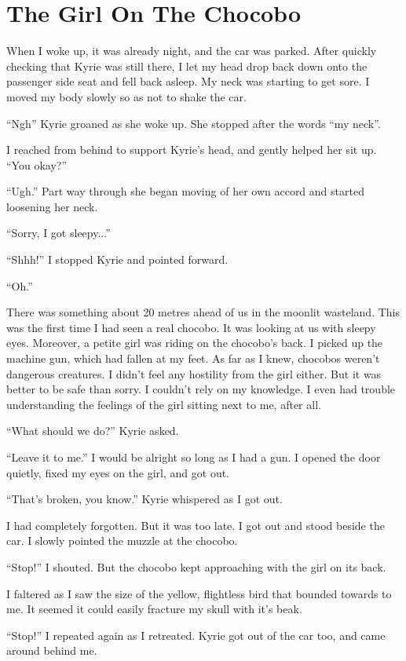 \documentclass[oneside]{book}
\begin{document}
\chapter{The Girl On The Chocobo}
When I woke up, it was already night, and the car was parked. After quickly checking that Kyrie was still there, I let my head drop back down onto the passenger side seat and fell back asleep. My neck was starting to get sore. I moved my body slowly so as not to shake the car.

“Ngh” Kyrie groaned as she woke up. She stopped after the words “my neck”.

I reached from behind to support Kyrie’s head, and gently helped her sit up. “You okay?”

“Ugh.” Part way through she began moving of her own accord and started loosening her neck.

“Sorry, I got sleepy...”

“Shhh!” I stopped Kyrie and pointed forward.

“Oh.”

There was something about 20 metres ahead of us in the moonlit wasteland. This was the first time I had seen a real chocobo. It was looking at us with sleepy eyes. Moreover, a petite girl was riding on the chocobo’s back. I picked up the machine gun, which had fallen at my feet. As far as I knew, chocobos weren’t dangerous creatures. I didn’t feel any hostility from the girl either. But it was better to be safe than sorry. I couldn’t rely on my knowledge. I even had trouble understanding the feelings of the girl sitting next to me, after all.

“What should we do?” Kyrie asked.

“Leave it to me.” I would be alright so long as I had a gun. I opened the door quietly, fixed my eyes on the girl, and got out.

“That’s broken, you know.” Kyrie whispered as I got out.

I had completely forgotten. But it was too late. I got out and stood beside the car. I slowly pointed the muzzle at the chocobo.

“Stop!” I shouted. But the chocobo kept approaching with the girl on its back.

I faltered as I saw the size of the yellow, flightless bird that bounded towards to me. It seemed it could easily fracture my skull with it’s beak.

“Stop!” I repeated again as I retreated. Kyrie got out of the car too, and came around behind me.
\end{document}
